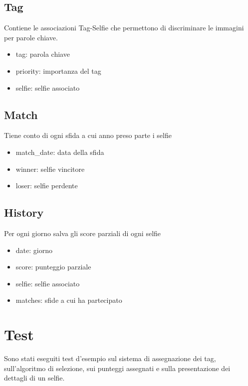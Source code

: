 \documentclass{article}
\begin{document}
\subsection{Tag}
Contiene le associazioni Tag-Selfie che permettono di discriminare le immagini per parole chiave.
\begin{itemize}
\item tag: parola chiave
\item priority: importanza del tag
\item selfie: selfie associato
\end{itemize}

\subsection{Match}
Tiene conto di ogni sfida a cui anno preso parte i selfie
\begin{itemize}
\item match\_date: data della sfida
\item winner: selfie vincitore
\item loser: selfie perdente
\end{itemize}

\subsection{History}
Per ogni giorno salva gli score parziali di ogni selfie
\begin{itemize}
\item date: giorno
\item score: punteggio parziale
\item selfie: selfie associato
\item matches: sfide a cui ha partecipato
\end{itemize}


\section{Test}
Sono stati eseguiti test d'esempio sul sistema di assegnazione dei tag, sull'algoritmo di selezione, sui punteggi assegnati
e sulla presentazione dei dettagli di un selfie.
\end{document}
